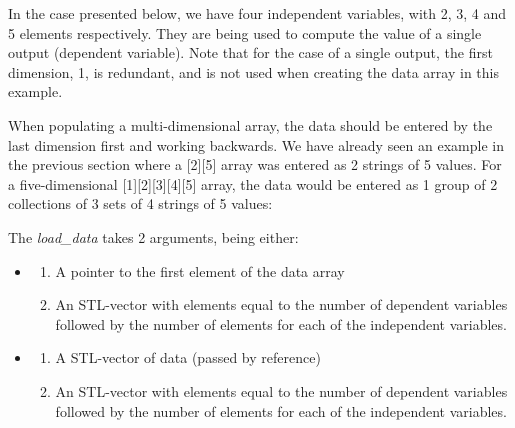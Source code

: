 \documentclass[11pt,fleqn]{report}
\begin{document}
In the case presented below, we have four independent variables, with
 2, 3, 4 and 5 elements respectively.  They are being used to compute
 the value of
 a single output (dependent variable).
 Note that for the case of a single output, the first
 dimension, 1, is redundant, and is not used when creating the data array
 in this example.

When populating a multi-dimensional array, the data should be entered by
 the last dimension first and working backwards.  We have already seen an
 example in the previous section where a [2][5] array was entered as 2
 strings of 5 values.
 For a five-dimensional [1][2][3][4][5] array, the data would be entered as
 1 group of 2 collections of 3 sets of 4 strings of 5 values:

The \textit{load\_data} takes 2 arguments, being either:
\begin{itemize}
 \item \begin{enumerate}
        \item A pointer to the first element of the data array
        \item An STL-vector with elements equal to the number of dependent
         variables followed by the number of elements for
         each of the independent variables.
       \end{enumerate}
 \item \begin{enumerate}
        \item A STL-vector of data (passed by reference)
        \item An STL-vector with elements equal to the number of dependent
         variables followed by the number of elements for
         each of the independent variables.
       \end{enumerate}
\end{itemize}
\end{document}
